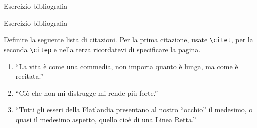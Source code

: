 \begin{frame}[fragile]{Esercizio bibliografia}

\begin{block}{Esercizio bibliografia}
    
Definire la seguente lista di citazioni.
Per la prima citazione, usate \texttt{\textbackslash citet}, per la seconda \texttt{\textbackslash citep} e nella terza ricordatevi di specificare la pagina.

\begin{enumerate}
\item ``La vita è come una commedia, non importa quanto è lunga, ma come è recitata.'' \citet{seneca}
\item ``Ciò che non mi distrugge mi rende più forte.'' \citep{nietzsche}
\item ``Tutti gli esseri della Flatlandia presentano al nostro ``occhio'' il medesimo, o quasi il medesimo aspetto, quello cioè di una Linea Retta.'' \citep[p. 42]{abbot}
\end{enumerate}

\end{block}

\end{frame}
